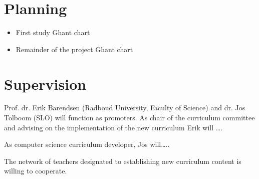 
\section{Planning}\label{sec:Planning}

\begin{itemize}
\item First study Ghant chart
\item Remainder of the project Ghant chart
\end{itemize}

\section{Supervision}\label{sec:Supervision}

Prof. dr. Erik Barendsen (Radboud University, Faculty of Science) and dr. Jos Tolboom (SLO) will function as promoters.
As chair of the curriculum committee and advising on the implementation of the new curriculum Erik will ….

As computer science curriculum developer, Jos will…..

The network of teachers designated to establishing new curriculum content is willing to cooperate.
